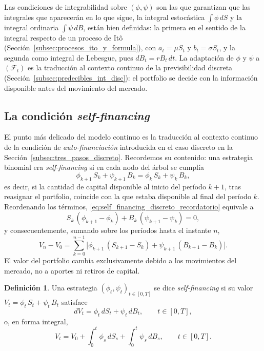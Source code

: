 \documentclass[11pt,a4paper,oneside]{report}
\theoremstyle{plain}
\theoremstyle{definition}
\newtheorem{definicion}[teorema]{Definición}
\theoremstyle{remark}
\newcommand{\F}{\mathcal{F}}
\newcommand{\1}{\mathbf{1}}
\begin{document}
Las condiciones de integrabilidad sobre $(\phi, \psi)$ son las que
garantizan que las integrales que aparecerán en lo que sigue, la integral
estocástica $\int \phi\, dS$ y la integral ordinaria $\int \psi\, dB$, están bien definidas: la primera en el sentido de la integral respecto de un proceso de Itô (Sección~\ref{subsec:procesos_ito_y_formula}), con $a_t = \mu S_t$ y $b_t = \sigma S_t$, y la segunda como integral de Lebesgue, pues $dB_t = r B_t\, dt$.
La adaptación de $\phi$ y $\psi$ a $(\F_t)$ es la traducción al
contexto continuo de la previsibilidad discreta
(Sección~\ref{subsec:predecibles_int_disc}): el portfolio se decide con
la información disponible antes del movimiento del mercado.

\subsection{La condición \emph{self-financing}}
\label{subsec:self_financing_continuo}

El punto más delicado del modelo continuo es la traducción
al contexto continuo de la condición de \emph{auto-financiación}
introducida en el caso discreto en la
Sección~\ref{subsec:tres_pasos_discreto}. Recordemos su contenido:
una estrategia binomial era \emph{self-financing} si en cada nodo del
árbol se cumplía
\begin{equation}\label{eq:self_financing_discreto_recordatorio}
  \phi_{k+1}\, S_k + \psi_{k+1}\, B_k = \phi_k\, S_k + \psi_k\, B_k,
\end{equation}
es decir, si la cantidad de capital disponible al inicio del período
$k+1$, tras reasignar el portfolio, coincide con la que estaba
disponible al final del período $k$. Reordenando los términos,
\eqref{eq:self_financing_discreto_recordatorio} equivale a
\begin{equation*}
  S_k\, (\phi_{k+1} - \phi_k) + B_k\, (\psi_{k+1} - \psi_k) = 0,
\end{equation*}
y consecuentemente, sumando sobre los períodos hasta el instante $n$,
\begin{equation*}
  V_n - V_0
  = \sum_{k=0}^{n-1} \bigl[\phi_{k+1}\, (S_{k+1} - S_k)
                            + \psi_{k+1}\, (B_{k+1} - B_k)\bigr].
\end{equation*}
El valor del portfolio cambia exclusivamente debido a los movimientos
del mercado, no a aportes ni retiros de capital.

\medskip

\begin{definicion}
\label{def:self_financing_continuo}
Una estrategia $(\phi_t, \psi_t)_{t \in [0, T]}$ se dice
\emph{self-financing} si su valor $V_t = \phi_t\, S_t + \psi_t\, B_t$
satisface
\begin{equation}\label{eq:self_financing_continuo}
  dV_t = \phi_t\, dS_t + \psi_t\, dB_t,
  \qquad t \in [0, T],
\end{equation}
o, en forma integral,
\begin{equation}\label{eq:self_financing_integral}
  V_t = V_0 + \int_0^t \phi_s\, dS_s + \int_0^t \psi_s\, dB_s,
  \qquad t \in [0, T].
\end{equation}
\end{definicion}
\end{document}

